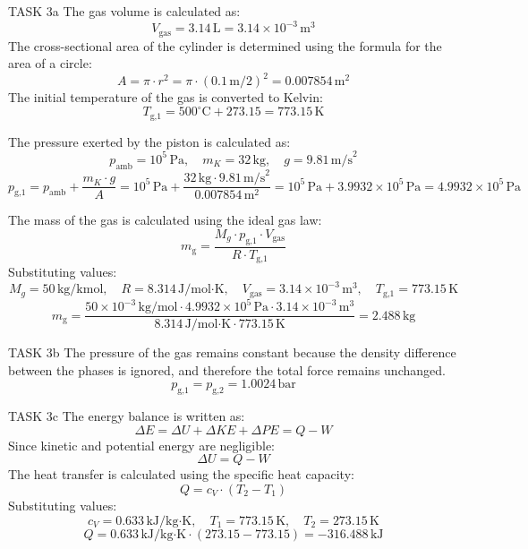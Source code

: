 TASK 3a  
The gas volume is calculated as:  
\[
V_{\text{gas}} = 3.14 \, \text{L} = 3.14 \times 10^{-3} \, \text{m}^3
\]  
The cross-sectional area of the cylinder is determined using the formula for the area of a circle:  
\[
A = \pi \cdot r^2 = \pi \cdot \left(0.1 \, \text{m} / 2\right)^2 = 0.007854 \, \text{m}^2
\]  
The initial temperature of the gas is converted to Kelvin:  
\[
T_{\text{g,1}} = 500^\circ\text{C} + 273.15 = 773.15 \, \text{K}
\]  

The pressure exerted by the piston is calculated as:  
\[
p_{\text{amb}} = 10^5 \, \text{Pa}, \quad m_K = 32 \, \text{kg}, \quad g = 9.81 \, \text{m/s}^2
\]  
\[
p_{\text{g,1}} = p_{\text{amb}} + \frac{m_K \cdot g}{A} = 10^5 \, \text{Pa} + \frac{32 \, \text{kg} \cdot 9.81 \, \text{m/s}^2}{0.007854 \, \text{m}^2} = 10^5 \, \text{Pa} + 3.9932 \times 10^5 \, \text{Pa} = 4.9932 \times 10^5 \, \text{Pa}
\]  

The mass of the gas is calculated using the ideal gas law:  
\[
m_{\text{g}} = \frac{M_g \cdot p_{\text{g,1}} \cdot V_{\text{gas}}}{R \cdot T_{\text{g,1}}}
\]  
Substituting values:  
\[
M_g = 50 \, \text{kg/kmol}, \quad R = 8.314 \, \text{J/mol·K}, \quad V_{\text{gas}} = 3.14 \times 10^{-3} \, \text{m}^3, \quad T_{\text{g,1}} = 773.15 \, \text{K}
\]  
\[
m_{\text{g}} = \frac{50 \times 10^{-3} \, \text{kg/mol} \cdot 4.9932 \times 10^5 \, \text{Pa} \cdot 3.14 \times 10^{-3} \, \text{m}^3}{8.314 \, \text{J/mol·K} \cdot 773.15 \, \text{K}} = 2.488 \, \text{kg}
\]  

TASK 3b  
The pressure of the gas remains constant because the density difference between the phases is ignored, and therefore the total force remains unchanged.  
\[
p_{\text{g,1}} = p_{\text{g,2}} = 1.0024 \, \text{bar}
\]  

TASK 3c  
The energy balance is written as:  
\[
\Delta E = \Delta U + \Delta KE + \Delta PE = Q - W
\]  
Since kinetic and potential energy are negligible:  
\[
\Delta U = Q - W
\]  
The heat transfer is calculated using the specific heat capacity:  
\[
Q = c_V \cdot (T_2 - T_1)
\]  
Substituting values:  
\[
c_V = 0.633 \, \text{kJ/kg·K}, \quad T_1 = 773.15 \, \text{K}, \quad T_2 = 273.15 \, \text{K}
\]  
\[
Q = 0.633 \, \text{kJ/kg·K} \cdot (273.15 - 773.15) = -316.488 \, \text{kJ}
\]  

